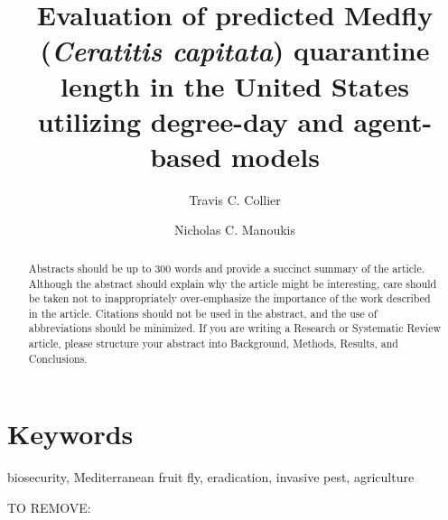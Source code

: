 \documentclass[10pt,a4paper,twocolumn]{article}
\begin{document}
\title{Evaluation of predicted Medfly (\textit{Ceratitis capitata}) quarantine length in the United States utilizing degree-day and agent-based models}

\author[1,2]{Travis C. Collier}
\author[1,3]{Nicholas C. Manoukis}

\maketitle
\thispagestyle{fancy}

\begin{abstract}
Abstracts should be up to 300 words and provide a succinct summary of the article. Although the abstract should explain why the article might be interesting, care should be taken not to inappropriately over-emphasize the importance of the work described in the article. Citations should not be used in the abstract, and the use of abbreviations should be minimized. If you are writing a Research or Systematic Review article, please structure your abstract into Background, Methods, Results, and Conclusions.
\end{abstract}

\section*{Keywords}
biosecurity, Mediterranean fruit fly, eradication, invasive pest, agriculture


\clearpage

TO REMOVE:
\end{document}
